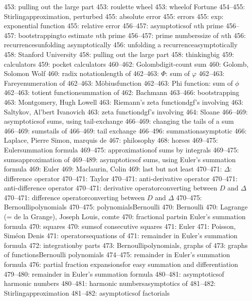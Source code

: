453: pulling out the large part
453: roulette wheel
453: wheel\sub of Fortune
454--455: Stirling\sub approximation, perturbed
455: absolute error
455: errors
455: exp: exponential function
455: relative error
456--457: asymptotics\sub of $n$th prime
456--457: bootstrapping\sub to estimate $n$th prime
456--457: prime numbers\sub size of $n$th
456: recurrences\sub unfolding asymptotically
456: unfolding a recurrence\sub asymptotically
458: Stanford University
458: pulling out the large part
458: thinking\sub big
459: calculators
459: pocket calculators
460--462: Golomb\sub digit-count sum
460: Golomb, Solomon Wolf
460: radix notation\sub length of
462--463: $\Phi$: sum of $\varphi$
462--463: Farey\sub enumeration of
462--463: M\"obius\sub function
462--463: Phi function: sum of $\phi$
462--463: totient function\sub summation of
462: Bachmann
463--466: bootstrapping
463: Montgomery, Hugh Lowell
463: Riemann's zeta function\sub dgf's involving
463: Saltykov, Al'bert Ivanovich
463: zeta function\sub dgf's involving
464: Sloane
466--469: asymptotics\sub of sums, using tail-exchange
466--469: changing the tails of a sum
466--469: sums\sub tails of
466--469: tail exchange
466--496: summation\sub asymptotic
466: Laplace, Pierre Simon, marquis de
467: philosophy
468: horses
469--475: Euler\sub summation formula
469--475: approximation\sub of sums by integrals
469--475: sums\sub approximation of
469--489: asymptotics\sub of sums, using Euler's summation formula
469: Euler
469: Maclaurin, Colin
469: last but not least
470--471: $\Delta$: difference operator
470--471: Taylor
470--471: anti-derivative operator
470--471: anti-difference operator
470--471: derivative operator\sub converting between $D$ and $\Delta$
470--471: difference operator\sub converting between $D$ and $\Delta$
470--475: Bernoulli\sub polynomials
470--475: polynomials\sub Bernoulli
470: Bernoulli
470: Lagrange (= de la Grange), Joseph Louis, comte
470: fractional parts\sub in Euler's summation formula
470: squares
470: sums\sub of consecutive squares
471: Euler
471: Poisson, Sim\'eon Denis
471: operators\sub equations of
471: remainder in Euler's summation formula
472: integration\sub by parts
473: Bernoulli\sub polynomials, graphs of
473: graphs of functions\sub Bernoulli polynomials
474--475: remainder in Euler's summation formula
476: partial fraction expansions\sub for easy summation and differentiation
479--480: remainder in Euler's summation formula
480--481: asymptotics\sub of harmonic numbers
480--481: harmonic numbers\sub asymptotics of
481--482: Stirling\sub approximation
481--482: asymptotics\sub of factorials
